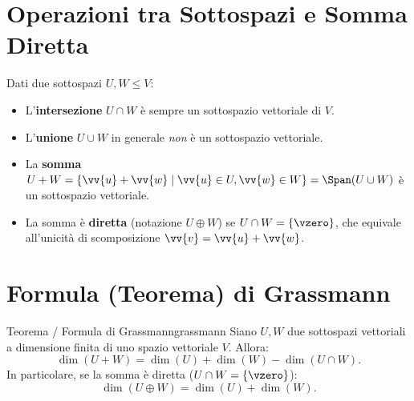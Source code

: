 \section{Operazioni tra Sottospazi e Somma Diretta}
Dati due sottospazi $U, W \le V$:
\begin{itemize}
    \item L'\textbf{intersezione} $U \cap W$ è sempre un sottospazio vettoriale di $V$.
    \item L'\textbf{unione} $U \cup W$ in generale \emph{non} è un sottospazio vettoriale.
    \item La \textbf{somma} $U + W = \{\vv{u} + \vv{w} \mid \vv{u} \in U, \vv{w} \in W\} = \Span(U \cup W)$ è un sottospazio vettoriale.
    \item La somma è \textbf{diretta} (notazione $U \oplus W$) se $U \cap W = \{\vzero\}$, che equivale all'unicità di scomposizione $\vv{v} = \vv{u} + \vv{w}$.
\end{itemize}

\section{Formula (Teorema) di Grassmann}

\begin{teorema}{Teorema / Formula di Grassmann}{grassmann}
Siano $U, W$ due sottospazi vettoriali a dimensione finita di uno spazio vettoriale $V$. Allora:
\begin{equation}
    \dim(U + W) = \dim(U) + \dim(W) - \dim(U \cap W).
\end{equation}
In particolare, se la somma è diretta ($U \cap W = \{\vzero\}$):
\begin{equation}
    \dim(U \oplus W) = \dim(U) + \dim(W).
\end{equation}
\end{teorema}
